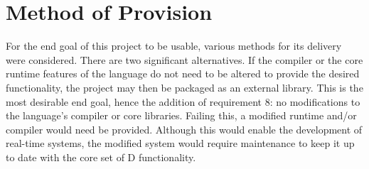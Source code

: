 \section{Method of Provision}
For the end goal of this project to be usable, various methods for its delivery 
were considered. There are two significant alternatives. 
If the compiler or the 
core runtime features of the language do not need to be altered to provide the 
desired functionality, 
the project may then be packaged as an external library. 
This is the most desirable end goal, hence the addition of requirement 8: no
modifications to the language's compiler or core libraries. 
Failing this, a modified runtime and/or compiler would need be provided.
Although this would 
enable the development of real-time systems, the modified system would 
require maintenance to keep it up to date with the core set of D functionality. 

